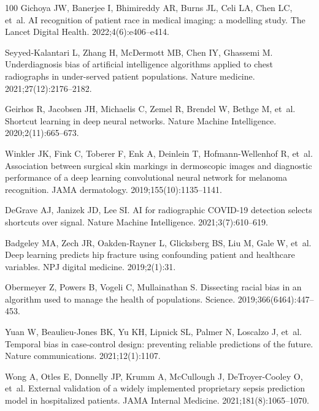 \documentclass[10pt,letterpaper]{article}
\begin{document}
\begin{thebibliography}{100}
  Gichoya JW, Banerjee I, Bhimireddy AR, Burns JL, Celi LA, Chen LC, et~al.
  \newblock AI recognition of patient race in medical imaging: a modelling study.
  \newblock The Lancet Digital Health. 2022;4(6):e406--e414.

  Seyyed-Kalantari L, Zhang H, McDermott MB, Chen IY, Ghassemi M.
  \newblock Underdiagnosis bias of artificial intelligence algorithms applied to chest radiographs in under-served patient populations.
  \newblock Nature medicine. 2021;27(12):2176--2182.

  Geirhos R, Jacobsen JH, Michaelis C, Zemel R, Brendel W, Bethge M, et~al.
  \newblock Shortcut learning in deep neural networks.
  \newblock Nature Machine Intelligence. 2020;2(11):665--673.

  Winkler JK, Fink C, Toberer F, Enk A, Deinlein T, Hofmann-Wellenhof R, et~al.
  \newblock Association between surgical skin markings in dermoscopic images and diagnostic performance of a deep learning convolutional neural network for melanoma recognition.
  \newblock JAMA dermatology. 2019;155(10):1135--1141.

  DeGrave AJ, Janizek JD, Lee SI.
  \newblock AI for radiographic COVID-19 detection selects shortcuts over signal.
  \newblock Nature Machine Intelligence. 2021;3(7):610--619.

  Badgeley MA, Zech JR, Oakden-Rayner L, Glicksberg BS, Liu M, Gale W, et~al.
  \newblock Deep learning predicts hip fracture using confounding patient and healthcare variables.
  \newblock NPJ digital medicine. 2019;2(1):31.

  Obermeyer Z, Powers B, Vogeli C, Mullainathan S.
  \newblock Dissecting racial bias in an algorithm used to manage the health of populations.
  \newblock Science. 2019;366(6464):447--453.

  Yuan W, Beaulieu-Jones BK, Yu KH, Lipnick SL, Palmer N, Loscalzo J, et~al.
  \newblock Temporal bias in case-control design: preventing reliable predictions of the future.
  \newblock Nature communications. 2021;12(1):1107.

  Wong A, Otles E, Donnelly JP, Krumm A, McCullough J, DeTroyer-Cooley O, et~al.
  \newblock External validation of a widely implemented proprietary sepsis prediction model in hospitalized patients.
  \newblock JAMA Internal Medicine. 2021;181(8):1065--1070.


\end{thebibliography}
\end{document}
